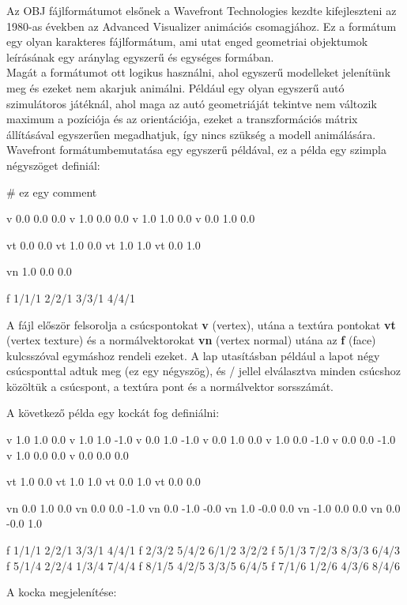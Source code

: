 
Az OBJ fájlformátumot elsőnek a Wavefront Technologies kezdte kifejleszteni az 1980-as években az Advanced Visualizer animációs csomagjához. Ez a formátum egy olyan karakteres fájlformátum, ami utat enged geometriai objektumok leírásának egy aránylag egyszerű és egységes formában. \\
Magát a formátumot ott logikus használni, ahol egyszerű modelleket jelenítünk meg és ezeket nem akarjuk animálni. Például egy olyan egyszerű autó szimulátoros játéknál, ahol maga az autó geometriáját tekintve nem változik maximum a pozíciója és az orientációja, ezeket a transzformációs mátrix állításával egyszerűen megadhatjuk, így nincs szükség a modell animálására.\\
Wavefront formátumbemutatása egy egyszerű példával, ez a példa egy szimpla négyszöget definiál:\\

\begin{cpp} 
# ez egy comment

v 0.0 0.0 0.0
v 1.0 0.0 0.0
v 1.0 1.0 0.0
v 0.0 1.0 0.0

vt 0.0 0.0
vt 1.0 0.0
vt 1.0 1.0
vt 0.0 1.0

vn 1.0 0.0 0.0 

f 1/1/1 2/2/1 3/3/1 4/4/1
\end{cpp}

A fájl először felsorolja a csúcspontokat \textbf{v} (vertex), utána a textúra pontokat \textbf{vt} (vertex texture) és a normálvektorokat \textbf{vn} (vertex normal) utána  az \textbf{f} (face) kulcsszóval egymáshoz rendeli ezeket. A lap utasításban például a lapot négy csúcsponttal adtuk meg (ez egy négyszög), és / jellel elválasztva minden csúcshoz közöltük a csúcspont, a textúra pont és a normálvektor sorsszámát. \newpage

\noindent A következő példa egy kockát fog definiálni:\\
\begin{cpp} 
v 1.0 1.0 0.0
v 1.0 1.0 -1.0
v 0.0 1.0 -1.0
v 0.0 1.0 0.0
v 1.0 0.0 -1.0
v 0.0 0.0 -1.0
v 1.0 0.0 0.0
v 0.0 0.0 0.0

vt 1.0 0.0
vt 1.0 1.0
vt 0.0 1.0
vt 0.0 0.0

vn 0.0 1.0 0.0
vn 0.0 0.0 -1.0
vn 0.0 -1.0 -0.0
vn 1.0 -0.0 0.0
vn -1.0 0.0 0.0
vn 0.0 -0.0 1.0

f 1/1/1 2/2/1 3/3/1 4/4/1
f 2/3/2 5/4/2 6/1/2 3/2/2
f 5/1/3 7/2/3 8/3/3 6/4/3
f 5/1/4 2/2/4 1/3/4 7/4/4
f 8/1/5 4/2/5 3/3/5 6/4/5
f 7/1/6 1/2/6 4/3/6 8/4/6
\end{cpp}
\noindent A kocka megjelenítése:

